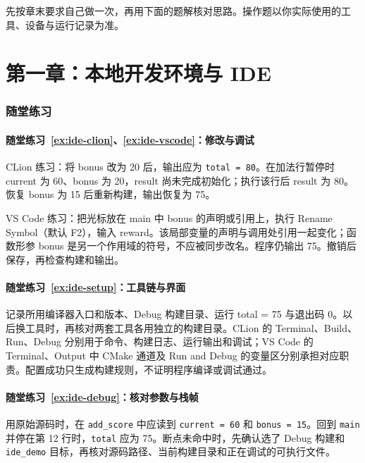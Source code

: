 \begingroup
\setlength{\emergencystretch}{3em}

先按章末要求自己做一次，再用下面的题解核对思路。操作题以你实际使用的工具、设备与运行记录为准。

\section*{第一章：本地开发环境与 IDE}
{}
\subsubsection*{随堂练习}

\paragraph*{随堂练习~\ref{ex:ide-clion}、\ref{ex:ide-vscode}：修改与调试}
\begin{solution}
CLion 练习：将 bonus 改为 20 后，输出应为 \texttt{total = 80}。在加法行暂停时 current 为 60、bonus 为 20，result 尚未完成初始化；执行该行后 result 为 80。恢复 bonus 为 15 后重新构建，输出恢复为 75。

VS Code 练习：把光标放在 main 中 bonus 的声明或引用上，执行 Rename Symbol（默认 F2），输入 reward。该局部变量的声明与调用处引用一起变化；函数形参 bonus 是另一个作用域的符号，不应被同步改名。程序仍输出 75。撤销后保存，再检查构建和输出。
\end{solution}

\paragraph*{随堂练习~\ref{ex:ide-setup}：工具链与界面}
\begin{solution}
记录所用编译器入口和版本、Debug 构建目录、运行 total = 75 与退出码 0。以后换工具时，再核对两套工具各用独立的构建目录。CLion 的 Terminal、Build、Run、Debug 分别用于命令、构建日志、运行输出和调试；VS Code 的 Terminal、Output 中 CMake 通道及 Run and Debug 的变量区分别承担对应职责。配置成功只生成构建规则，不证明程序编译或调试通过。
\end{solution}
\paragraph*{随堂练习~\ref{ex:ide-debug}：核对参数与栈帧}
\begin{solution}
用原始源码时，在 \texttt{add\_score} 中应读到 \texttt{current = 60} 和 \texttt{bonus = 15}。回到 \texttt{main} 并停在第 12 行时，\texttt{total} 应为 75。断点未命中时，先确认选了 Debug 构建和 \texttt{ide\_demo} 目标，再核对源码路径、当前构建目录和正在调试的可执行文件。
\end{solution}

